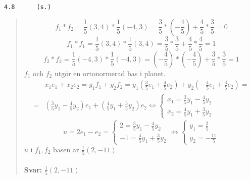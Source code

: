 \documentclass[a4paper]{article}
\newcommand{\tskcol}[1]{\textcolor{tskcol}{#1}}
\begin{document}
\texttt{\tskcol{4.8~~~~~ (s.)}}
\begin{quotation}
	\noindent
	\[f_1*f_2=\frac{1}{5}(3,4)*\frac{1}{5}(-4,3)=\frac{3}{5}*(-\frac{4}{5})+\frac{4}{5}*\frac{3}{5}=0\]
	\[f_1*f_1=\frac{1}{5}(3,4)*\frac{1}{5}(3,4)=\frac{3}{5}*\frac{3}{5}+\frac{4}{5}*\frac{4}{5}=1\]
	\[f_2*f_2=\frac{1}{5}(-4,3)*\frac{1}{5}(-4,3)=(-\frac{4}{5})*(-\frac{4}{5})+\frac{3}{5}*\frac{3}{5}=1\]
	$f_1$ och $f_2$ utgör en ortonormerad bas i planet.
	\begin{align*}
	&x_1e_1+x_2e_2=y_1f_1+y_2f_2=
	y_1(\frac{3}{5}e_1+\frac{4}{5}e_2)+y_2(-\frac{4}{5}e_1+\frac{3}{5}e_2)= \\ =
	&(\frac{3}{5}y_1-\frac{4}{5}y_2)e_1+(\frac{4}{5}y_1+\frac{3}{5}y_2)e_2 \Leftrightarrow
	\begin{cases}
	x_1=\frac{3}{5}y_1-\frac{4}{5}y_2 \\
	x_2=\frac{4}{5}y_1+\frac{3}{5}y_2
	\end{cases}
	\end{align*}
	\[u=2e_1-e_2=
	\begin{cases}
	2=\frac{3}{5}y_1-\frac{4}{5}y_2 \\
	-1=\frac{4}{5}y_1+\frac{3}{5}y_2
	\end{cases} \Leftrightarrow
	\begin{cases}
	y_1=\frac{2}{5} \\
	y_2=-\frac{11}{5}
	\end{cases}
	\]
	$u$ i $f_1,f_2$ basen är $\frac{1}{5}(2,-11)$
	\\ \\
	\textbf{Svar:} $\frac{1}{5}(2,-11)$
\end{quotation}
\end{document}
